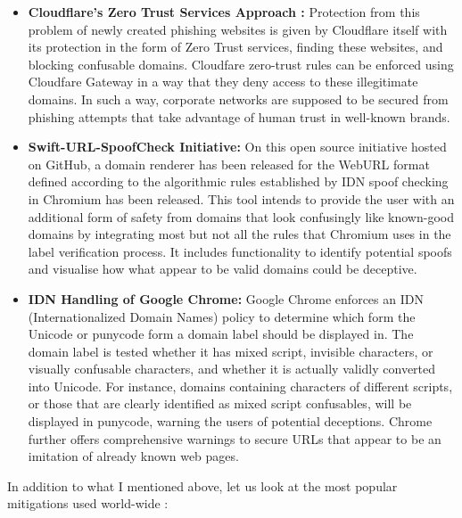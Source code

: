 \begin{itemize}
    \item \textbf{Cloudflare's Zero Trust Services Approach :} Protection from this problem of newly created phishing websites is given by Cloudflare itself with its protection in the form of Zero Trust services, finding these websites, and blocking confusable domains. Cloudfare zero-trust rules can be enforced using Cloudfare Gateway in a way that they deny access to these illegitimate domains. In such a way, corporate networks are supposed to be secured from phishing attempts that take advantage of human trust in well-known brands. \cite{Cloudflare2023}

     \item \textbf{Swift-URL-SpoofCheck Initiative: } On this open source initiative hosted on GitHub, a domain renderer has been released for the WebURL format defined according to the algorithmic rules established by IDN spoof checking in Chromium has been released. This tool intends to provide the user with an additional form of safety from domains that look confusingly like known-good domains by integrating most but not all the rules that Chromium uses in the label verification process. It includes functionality to identify potential spoofs and visualise how what appear to be valid domains could be deceptive. \cite{KarwaSwiftURLSpoofCheck}
     
     \item \textbf{IDN Handling of Google Chrome: } Google Chrome enforces an IDN (Internationalized Domain Names) policy to determine which form the Unicode or punycode form a domain label should be displayed in. The domain label is tested whether it has mixed script, invisible characters, or visually confusable characters, and whether it is actually validly converted into Unicode. For instance, domains containing characters of different scripts, or those that are clearly identified as mixed script confusables, will be displayed in punycode, warning the users of potential deceptions. Chrome further offers comprehensive warnings to secure URLs that appear to be an imitation of already known web pages. \cite{ChromiumIDN}
     
\end{itemize}

In addition to what I mentioned above, let us look at the most popular mitigations used world-wide :

